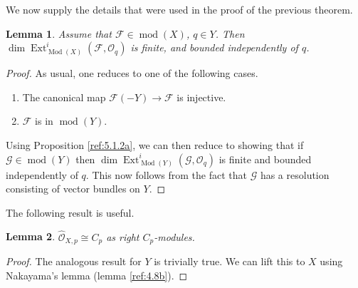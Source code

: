 \documentclass{amsproc}
\def\Fscr{{\mathcal F}}
\def\Gscr{{\mathcal G}}
\def\Oscr{{\mathcal O}}
\def\Ext{\operatorname {Ext}}
\def\coh{\operatorname {mod}}
\def\Qch{\operatorname {Mod}}
\def\r{\rightarrow}
\newtheorem{lemmas}{Lemma}[subsection]
\theoremstyle{definition}
\theoremstyle{remark}
\numberwithin{equation}{section}
\numberwithin{table}{section}
\numberwithin{figure}{section}
\begin{document}
We now supply  the details that were used in the proof of the
previous theorem.
\begin{lemmas} 
\label{ref:5.3.2a}
Assume that $\Fscr\in \coh(X)$, $q\in Y$. Then 
$\dim \Ext^i_{\Qch(X)}(\Fscr,\Oscr_q)$ is finite, and bounded independently
of $q$.
\end{lemmas}
\begin{proof}
As usual, one  reduces to one of the  following cases.
\begin{enumerate}
\item The canonical map $\Fscr(-Y)\r \Fscr$ is injective.
\item $\Fscr$ is in $\coh(Y)$.
\end{enumerate}
Using Proposition \ref{ref:5.1.2a}, we can then reduce to
showing that if $\Gscr\in\coh(Y)$ then $\dim
\Ext^i_{\Qch(Y)}(\Gscr,\Oscr_q)$ is finite and bounded independently of
$q$. This now follows from the fact
that $\Gscr$ has a resolution consisting of vector bundles on $Y$.
\end{proof}
The following result is useful.
\begin{lemmas}\label{ref:5.3.3a} $\hat{\Oscr}_{X,p}\cong C_p$ as right $C_p$-modules.
\end{lemmas}
\begin{proof} The analogous result for $Y$ is trivially true. We can lift
this to $X$ using Nakayama's lemma (lemma \ref{ref:4.8b}).
\end{proof}
\end{document}

